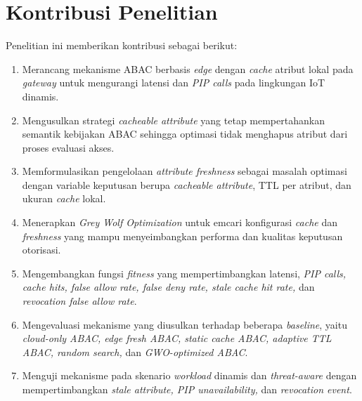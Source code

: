 \section{Kontribusi Penelitian}

Penelitian ini memberikan kontribusi sebagai berikut:

\begin{enumerate}
    \item Merancang mekanisme ABAC berbasis \textit{edge} dengan \textit{cache} atribut lokal pada \textit{gateway} untuk mengurangi latensi dan \textit{PIP calls} pada lingkungan IoT dinamis.
    \item Mengusulkan strategi \textit{cacheable attribute} yang tetap mempertahankan semantik kebijakan ABAC sehingga optimasi tidak menghapus atribut dari proses evaluasi akses.
    \item Memformulasikan pengelolaan \textit{attribute freshness} sebagai masalah optimasi dengan variable keputusan berupa \textit{cacheable attribute}, TTL per atribut, dan ukuran \textit{cache} lokal.
    \item Menerapkan \textit{Grey Wolf Optimization} untuk emcari konfigurasi \textit{cache} dan \textit{freshness} yang mampu menyeimbangkan performa dan kualitas keputusan otorisasi.
    \item Mengembangkan fungsi \textit{fitness} yang mempertimbangkan latensi, \textit{PIP calls, cache hits, false allow rate, false deny rate, stale cache hit rate,} dan \textit{revocation false allow rate}.
    \item Mengevaluasi mekanisme yang diusulkan terhadap beberapa \textit{baseline}, yaitu \textit{cloud-only ABAC, edge fresh ABAC, static cache ABAC, adaptive TTL ABAC, random search,} dan \textit{GWO-optimized ABAC}.
    \item Menguji mekanisme pada skenario \textit{workload} dinamis dan \textit{threat-aware} dengan mempertimbangkan \textit{stale attribute, PIP unavailability,} dan \textit{revocation event}.
\end{enumerate}
